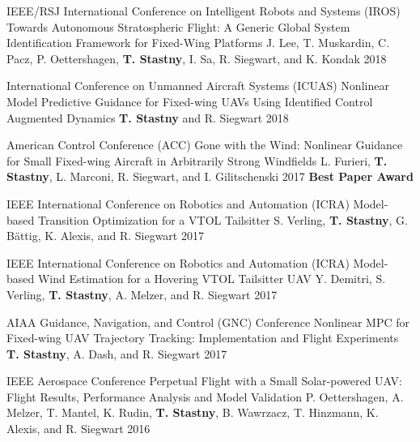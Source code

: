 \begin{cventries}
\begin{cvnumlist}
\item \cvpubentry
	{IEEE/RSJ International Conference on Intelligent Robots and Systems (IROS)} %
	{Towards Autonomous Stratospheric Flight: A Generic Global System Identification Framework for Fixed-Wing Platforms} %
	{J. Lee, T. Muskardin, C. Pacz, P. Oettershagen, \textbf{T. Stastny}, I. Sa, R. Siegwart, and K. Kondak} %
	{} %
	{2018} %
	{} %
	{} %

\item \cvpubentry
	{International Conference on Unmanned Aircraft Systems (ICUAS)} %
	{Nonlinear Model Predictive Guidance for Fixed-wing UAVs Using Identified Control Augmented Dynamics} %
	{\textbf{T. Stastny} and R. Siegwart} %
	{} %
	{2018} %
	{} %
	{} %

\item \cvpubentry
	{American Control Conference (ACC)} %
	{Gone with the Wind: Nonlinear Guidance for Small Fixed-wing Aircraft in Arbitrarily Strong Windfields} %
	{L. Furieri, \textbf{T. Stastny}, L. Marconi, R. Siegwart, and I. Gilitschenski} %
	{} %
	{2017} %
	{} %
	{\textbf{Best Paper Award}} %
	
\item \cvpubentry
	{IEEE International Conference on Robotics and Automation (ICRA)} %
	{Model-based Transition Optimization for a VTOL Tailsitter} %
	{S. Verling, \textbf{T. Stastny}, G. B{\"a}ttig, K. Alexis, and R. Siegwart} %
	{} %
	{2017} %
	{} %
	{} %
	
\item \cvpubentry
	{IEEE International Conference on Robotics and Automation (ICRA)} %
	{Model-based Wind Estimation for a Hovering VTOL Tailsitter UAV} %
	{Y. Demitri, S. Verling, \textbf{T. Stastny}, A. Melzer, and R. Siegwart} %
	{} %
	{2017} %
	{} %
	{} %
		
\item \cvpubentry
	{AIAA Guidance, Navigation, and Control (GNC) Conference} %
	{Nonlinear MPC for Fixed-wing UAV Trajectory Tracking: Implementation and Flight Experiments} %
	{\textbf{T. Stastny}, A. Dash, and R. Siegwart} %
	{} %
	{2017} %
	{} %
	{} %

\item \cvpubentry
	{IEEE Aerospace Conference} %
	{Perpetual Flight with a Small Solar-powered UAV: Flight Results, Performance Analysis and Model Validation} %
	{P. Oettershagen, A. Melzer, T. Mantel, K. Rudin, \textbf{T. Stastny}, B. Wawrzacz, T. Hinzmann, K. Alexis, and R. Siegwart} %
	{} %
	{2016} %
	{} %
	{} %



\end{cvnumlist}
\end{cventries}
